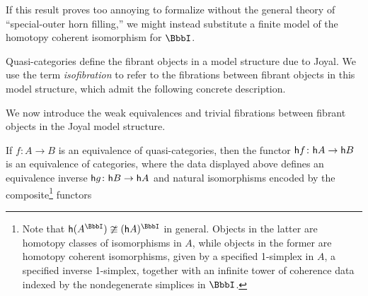 \begin{rmk}
If this result proves too annoying to formalize without the general theory of ``special-outer horn filling,'' we might instead substitute a finite model of the homotopy coherent isomorphism for $\iso$.
\end{rmk}



Quasi-categories define the fibrant objects in a model structure due to Joyal. We use the term \emph{isofibration} to refer to the fibrations between fibrant objects in this model structure, which admit the following concrete description.


We now introduce the weak equivalences and trivial fibrations between fibrant objects in the Joyal model structure.


  \begin{lemma}\label{lem:qcat-htpy-cat-equiv}
    If $f \colon A \to B$ is an equivalence of quasi-categories, then the functor ${\mathord{\mathsf{h}}}{f} \colon {\mathord{\mathsf{h}}}{A} \to {\mathord{\mathsf{h}}}{B}$ is an equivalence of categories, where the data displayed above defines an equivalence inverse ${\mathord{\mathsf{h}}}{g} \colon {\mathord{\mathsf{h}}}{B} \to {\mathord{\mathsf{h}}}{A}$ and natural isomorphisms encoded by the composite\footnote{Note that $\ho(A^\iso) \ncong (\ho{A})^\iso$ in general. Objects in the latter are homotopy classes of isomorphisms in $A$, while objects in the former are homotopy coherent isomorphisms, given by a specified 1-simplex in $A$, a specified inverse 1-simplex, together with an infinite tower of coherence data indexed by the nondegenerate simplices in $\iso$.} functors
  \begin{center} 
  \end{center}
  \end{lemma}



